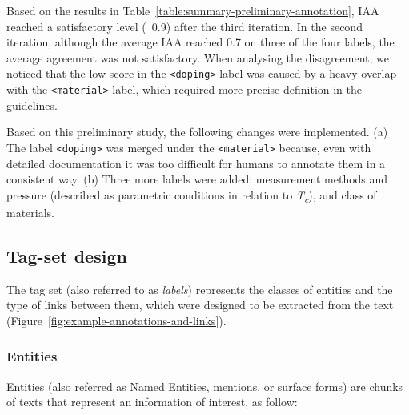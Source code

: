 \documentclass[fleqn,10pt]{wlscirep}
\begin{document}
Based on the results in Table~\ref{table:summary-preliminary-annotation}, IAA reached a satisfactory level (~0.9) after the third iteration. 
In the second iteration, although the average IAA reached 0.7 on three of the four labels, the average agreement was not satisfactory. 
When analysing the disagreement, we noticed that the low score in the \texttt{<doping>} label was caused by a heavy overlap with the \texttt{<material>} label, which required more precise definition in the guidelines. 

Based on this preliminary study, the following changes were implemented. 
(a) The label \texttt{<doping>} was merged under the \texttt{<material>} because, even with detailed documentation it was too difficult for humans to annotate them in a consistent way.
(b) Three more labels were added: measurement methods and pressure (described as parametric conditions in relation to \textit{T\textsubscript{c}}), and class of materials. 

\subsection*{Tag-set design}
The tag set (also referred to as \textit{labels}) represents the classes of entities and the type of links between them, which were designed to be extracted from the text (Figure~\ref{fig:example-annotations-and-links}).

\subsubsection*{Entities}
Entities (also referred as Named Entities, mentions, or surface forms) are chunks of texts that represent an information of interest, as follow: 
\end{document}
